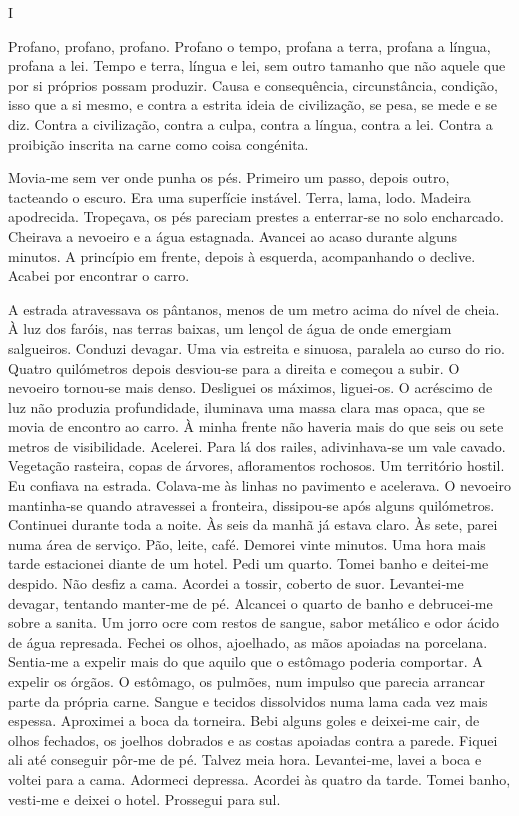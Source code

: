

I

Profano, profano, profano. Profano o tempo, profana a terra, profana a
língua, profana a lei. Tempo e terra, língua e lei, sem outro tamanho
que não aquele que por si próprios possam produzir. Causa e
consequência, circunstância, condição, isso que a si mesmo, e contra a
estrita ideia de civilização, se pesa, se mede e se diz. Contra a
civilização, contra a culpa, contra a língua, contra a lei. Contra a
proibição inscrita na carne como coisa congénita.

Movia­‑me sem ver onde punha os pés. Primeiro um passo, depois outro,
tacteando o escuro. Era uma superfície instável. Terra, lama, lodo.
Madeira apodrecida. Tropeçava, os pés pareciam prestes a enterrar­‑se no
solo encharcado. Cheirava a nevoeiro e a água estagnada. Avancei ao
acaso durante alguns minutos. A princípio em frente, depois à esquerda,
acompanhando o declive. Acabei por encontrar o carro.

A estrada atravessava os pântanos, menos de um metro acima do nível de
cheia. À luz dos faróis, nas terras baixas, um lençol de água de onde
emergiam salgueiros. Conduzi devagar. Uma via estreita e sinuosa,
paralela ao curso do rio. Quatro quilómetros depois desviou­‑se para a
direita e começou a subir. O nevoeiro tornou­‑se mais denso. Desliguei
os máximos, liguei­‑os. O acréscimo de luz não produzia profundidade,
iluminava uma massa clara mas opaca, que se movia de encontro ao carro.
À minha frente não haveria mais do que seis ou sete metros de
visibilidade. Acelerei. Para lá dos railes, adivinhava­‑se um vale
cavado. Vegetação rasteira, copas de árvores, afloramentos rochosos. Um
território hostil. Eu confiava na estrada. Colava­‑me às linhas no
pavimento e acelerava. O nevoeiro mantinha­‑se quando atravessei a
fronteira, dissipou­‑se após alguns quilómetros. Continuei durante toda
a noite. Às seis da manhã já estava claro. Às sete, parei numa área de
serviço. Pão, leite, café. Demorei vinte minutos. Uma hora mais tarde
estacionei diante de um hotel. Pedi um quarto. Tomei banho e deitei­‑me
despido. Não desfiz a cama. Acordei a tossir, coberto de suor.
Levantei­‑me devagar, tentando manter­‑me de pé. Alcancei o quarto de
banho e debrucei­‑me sobre a sanita. Um jorro ocre com restos de sangue,
sabor metálico e odor ácido de água represada. Fechei os olhos,
ajoelhado, as mãos apoiadas na porcelana. Sentia­‑me a expelir mais do
que aquilo que o estômago poderia comportar. A expelir os órgãos. O
estômago, os pulmões, num impulso que parecia arrancar parte da própria
carne. Sangue e tecidos dissolvidos numa lama cada vez mais espessa.
Aproximei a boca da torneira. Bebi alguns goles e deixei­‑me cair, de
olhos fechados, os joelhos dobrados e as costas apoiadas contra a
parede. Fiquei ali até conseguir pôr­‑me de pé. Talvez meia hora.
Levantei­‑me, lavei a boca e voltei para a cama. Adormeci depressa.
Acordei às quatro da tarde. Tomei banho, vesti­‑me e deixei o hotel.
Prossegui para sul.

